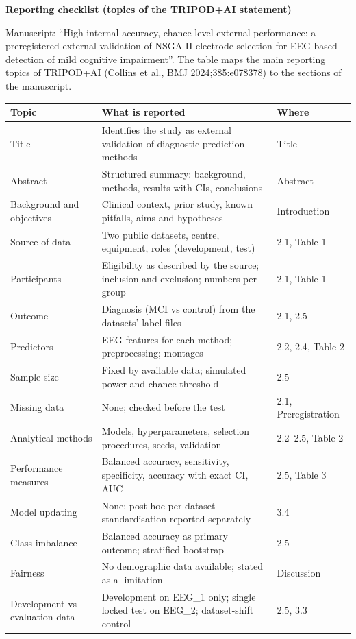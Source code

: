 \documentclass[10pt,letterpaper]{article}
\begin{document}
{\large\bfseries Reporting checklist (topics of the TRIPOD+AI statement)}\par\smallskip
Manuscript: ``High internal accuracy, chance-level external performance: a preregistered external validation of NSGA-II electrode selection for EEG-based detection of mild cognitive impairment''. The table maps the main reporting topics of TRIPOD+AI (Collins et al., BMJ 2024;385:e078378) to the sections of the manuscript.\par\medskip
\begin{longtable}{@{}p{4.2cm}p{8.2cm}p{3.6cm}@{}}
\toprule
Topic & What is reported & Where \\
\midrule\endhead
Title & Identifies the study as external validation of diagnostic prediction methods & Title \\
Abstract & Structured summary: background, methods, results with CIs, conclusions & Abstract \\
Background and objectives & Clinical context, prior study, known pitfalls, aims and hypotheses & Introduction \\
Source of data & Two public datasets, centre, equipment, roles (development, test) & 2.1, Table 1 \\
Participants & Eligibility as described by the source; inclusion and exclusion; numbers per group & 2.1, Table 1 \\
Outcome & Diagnosis (MCI vs control) from the datasets' label files & 2.1, 2.5 \\
Predictors & EEG features for each method; preprocessing; montages & 2.2, 2.4, Table 2 \\
Sample size & Fixed by available data; simulated power and chance threshold & 2.5 \\
Missing data & None; checked before the test & 2.1, Preregistration \\
Analytical methods & Models, hyperparameters, selection procedures, seeds, validation & 2.2--2.5, Table 2 \\
Performance measures & Balanced accuracy, sensitivity, specificity, accuracy with exact CI, AUC & 2.5, Table 3 \\
Model updating & None; post hoc per-dataset standardisation reported separately & 3.4 \\
Class imbalance & Balanced accuracy as primary outcome; stratified bootstrap & 2.5 \\
Fairness & No demographic data available; stated as a limitation & Discussion \\
Development vs evaluation data & Development on EEG\_1 only; single locked test on EEG\_2; dataset-shift control & 2.5, 3.3 \\

\end{longtable}
\end{document}
